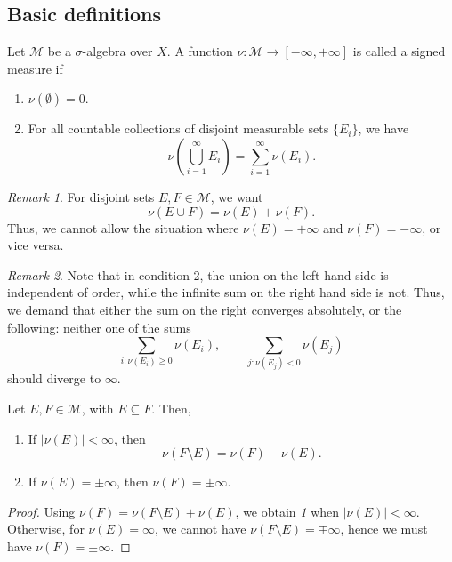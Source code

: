 \documentclass[11pt]{article}
\newcommand{\M}{\mathcal{M}}
\theoremstyle{definition}
\theoremstyle{remark}
\newtheorem*{remark}{Remark}
\begin{document}
    \subsection{Basic definitions}

    \begin{definition}
        Let $\M$ be a $\sigma$-algebra over $X$. A function $\nu\colon \M \to
        [-\infty, +\infty]$ is called a signed measure if \begin{enumerate}
            \item $\nu(\emptyset) = 0$.
            \item For all countable collections of disjoint measurable sets
            $\{E_i\}$, we have \[
                \nu\left(\bigcup_{i = 1}^\infty E_i\right) = \sum_{i = 1}^\infty
                \nu(E_i).
            \]
        \end{enumerate}
        \begin{remark}
            For disjoint sets $E, F \in \M$, we want \[
                \nu(E \cup F) = \nu(E) + \nu(F).
            \] Thus, we cannot allow the situation where $\nu(E) = +\infty$ and
            $\nu(F) = -\infty$, or vice versa.
        \end{remark}
        \begin{remark}
            Note that in condition 2, the union on the left hand side is independent
            of order, while the infinite sum on the right hand side is not. Thus, we
            demand that either the sum on the right converges absolutely, or the
            following: neither one of the sums \[
                \sum_{i: \nu(E_i) \geq 0} \nu(E_i), \qquad
                \sum_{j: \nu(E_j) < 0} \nu(E_j)
            \] should diverge to $\infty$.
        \end{remark}
    \end{definition}

    \begin{lemma}
        Let $E, F \in \M$, with $E \subseteq F$. Then, \begin{enumerate}
            \item If $|\nu(E)| < \infty$, then \[
                \nu(F\setminus E) = \nu(F) - \nu(E).
            \]
            \item If $\nu(E) = \pm\infty$, then $\nu(F) = \pm\infty$.
        \end{enumerate}
    \end{lemma}
    \begin{proof}
        Using $\nu(F) = \nu(F\setminus E) + \nu(E)$, we obtain \emph{1} when
        $|\nu(E)| < \infty$. Otherwise, for $\nu(E) = \infty$, we cannot have
        $\nu(F\setminus E) = \mp\infty$, hence we must have $\nu(F) = \pm \infty$.
    \end{proof}
\end{document}
